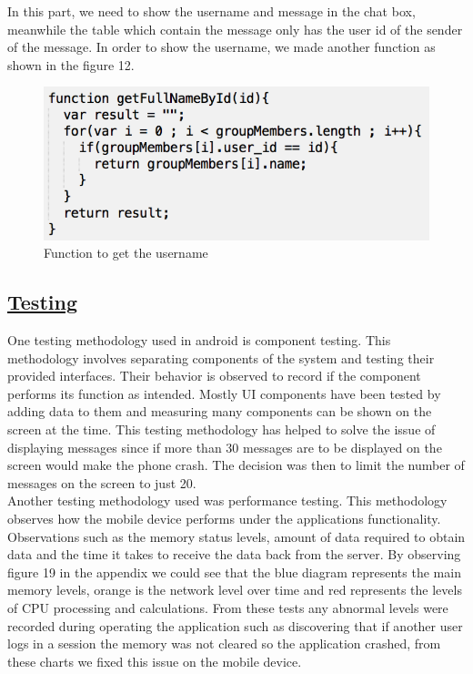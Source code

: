 \documentclass{article}
\begin{document}
\begin{enumerate}
\begin{enumerate}
		In this part, we need to show the username and message in the chat box, meanwhile the table which contain the message only has the user id of the sender of the message. In order to show the username, we made another function as shown in the figure 12.
		
		\begin{figure}[H]
			\centering
			\includegraphics[scale=0.4]{problemWeb3-1.png}
			\caption{Function to get the username}
		\end{figure}
		
	\end{enumerate}

	\newpage
	
	\subsection{\underline{\textbf{Testing}}}

	One testing methodology used in android is component testing. This methodology involves separating components of the system and testing their provided interfaces. Their behavior is observed to record if the component performs its function as intended. Mostly UI components have been tested by adding data to them and measuring many components can be shown on the screen at the time. This testing methodology has helped to solve the issue of displaying messages since if more than 30 messages are to be displayed on the screen would make the phone crash. The decision was then to limit the number of messages on the screen to just 20.\\

	Another testing methodology used was performance testing. This methodology observes how the mobile device performs under the applications functionality. Observations such as the memory status levels, amount of data required to obtain data and the time it takes to receive the data back from the server. By observing figure 19 in the appendix we could see that the blue diagram represents the main memory levels, orange is the network level over time and red represents the levels of CPU processing and calculations. From these tests any abnormal levels were recorded during operating the application such as discovering that if another user logs in a session the memory was not cleared so the application crashed, from these charts we fixed this issue on the mobile device.\par


\end{enumerate}
\end{document}
